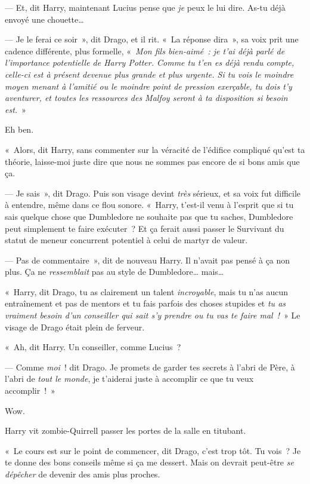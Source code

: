 --- Et, dit Harry, maintenant Lucius pense que \emph{je} peux le lui dire.
As-tu déjà envoyé une chouette…

--- Je le ferai ce soir~», dit Drago, et il rit.
«~La réponse dira~», sa voix prit une cadence différente, plus formelle, «~\emph{Mon fils bien-aimé~: je t'ai déjà parlé de l'importance potentielle de Harry Potter.
Comme tu t'en es déjà rendu compte, celle-ci est à présent devenue plus grande et plus urgente.
Si tu vois le moindre moyen menant à l'amitié ou le moindre point de pression exerçable, tu dois t'y aventurer, et toutes les ressources des Malfoy seront à ta disposition si besoin est.}~»

Eh ben.

«~Alors, dit Harry, sans commenter sur la véracité de l'édifice compliqué qu'est ta théorie, laisse-moi juste dire que nous ne sommes pas encore de si bons amis que ça.

--- Je sais~», dit Drago.
Puis son visage devint \emph{très} sérieux, et sa voix fut difficile à entendre, même dans ce flou sonore.
«~Harry, t'est-il venu à l'esprit que si tu sais quelque chose que Dumbledore ne souhaite pas que tu saches, Dumbledore peut simplement te faire exécuter~?
Et ça ferait aussi passer le Survivant du statut de meneur concurrent potentiel à celui de martyr de valeur.

--- Pas de commentaire~», dit de nouveau Harry.
Il n'avait pas pensé à ça non plus.
Ça ne \emph{ressemblait} pas au style de Dumbledore… mais…

«~Harry, dit Drago, tu as clairement un talent \emph{incroyable}, mais tu n'as aucun entraînement et pas de mentors et tu fais parfois des choses stupides et \emph{tu as vraiment besoin d'un conseiller qui sait s'y prendre ou tu vas te faire mal~!}~» Le visage de Drago était plein de ferveur.

«~Ah, dit Harry.
Un conseiller, comme Lucius~?

--- Comme \emph{moi}~! dit Drago.
Je promets de garder tes secrets à l'abri de Père, à l'abri de \emph{tout le monde}, je t'aiderai juste à accomplir ce que tu veux accomplir~!~»

Wow.

Harry vit zombie-Quirrell passer les portes de la salle en titubant.

«~Le cours est sur le point de commencer, dit Drago, c'est trop tôt.
Tu vois~?
Je te donne des bons conseils même si ça me dessert.
Mais on devrait peut-être \emph{se dépêcher} de devenir des amis plus proches.

